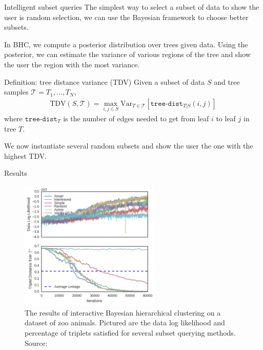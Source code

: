 \documentclass[10pt, compress]{beamer}
\begin{document}
\begin{frame}{Intelligent subset queries}
  The simplest way to select a subset of data
  to show the user is random selection,
  we can use the Bayesian framework to choose better subsets.

  In BHC, we compute a posterior distribution over
  trees given data. Using the posterior,
  we can estimate the variance
  of various regions of the tree and show the
  user the region with the most variance.

  \begin{block}{Definition: tree distance variance (TDV)}
    Given a subset of data $S$ and tree samples $\mathcal{T} = T_1, \ldots, T_N$,
    \begin{align}
      \mathrm{TDV}(S, \mathcal{T}) = \max_{i, j \in S}  \mathrm{Var}_{T \in \mathcal{T}}\left[\texttt{tree-dist}_{T|S}(i, j)\right]
    \end{align}
  where $\texttt{tree-dist}_T$ is the number of edges needed to get from leaf $i$ to leaf $j$
  in tree $T$.
  \end{block}

  We now instantiate several random subsets and show the user the one with the highest TDV.
\end{frame}

\begin{frame}{Results}
  \begin{figure}
    \centering
    \includegraphics[frame, width=0.6\textwidth]{img/interactive}
    \caption{The results of interactive Bayesian hierarchical clustering
    on a dataset of zoo animals. Pictured are the
    data log likelihood and percentage of triplets
    satisfied for several subset querying methods. Source: \cite{Vikram2016}}
    \label{fig:ibhc}
  \end{figure}
\end{frame}
\end{document}
